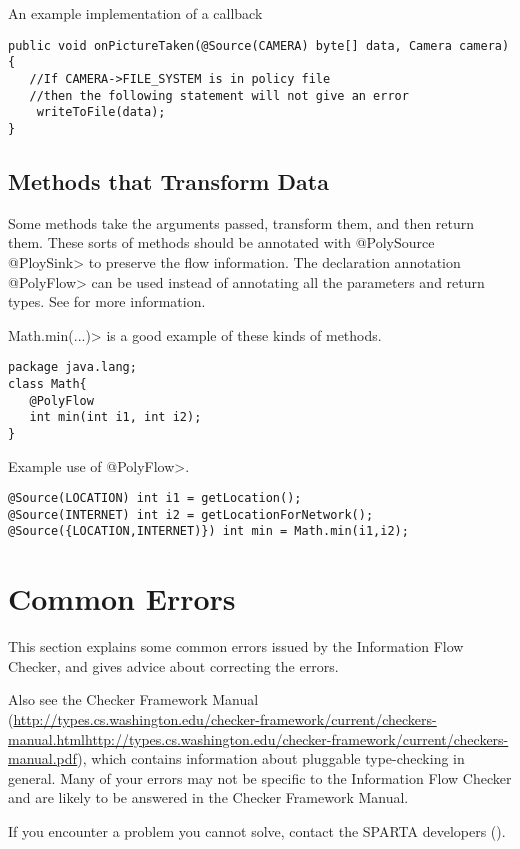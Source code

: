 An example implementation of a callback
\begin{Verbatim}
public void onPictureTaken(@Source(CAMERA) byte[] data, Camera camera){
   //If CAMERA->FILE_SYSTEM is in policy file
   //then the following statement will not give an error
    writeToFile(data);
}
\end{Verbatim}


\subsection{Methods that Transform Data}

Some methods take the arguments passed, transform them, and then return them.  These sorts of 
methods should be annotated with \<@PolySource @PloySink>
  to preserve the flow information.  The declaration annotation \<@PolyFlow> can be used instead of
  annotating all the parameters and return types. See  for more information. 
  
  \<Math.min(...)> is a good example of these kinds of methods. 
  
  \begin{Verbatim}
package java.lang;
class Math{
   @PolyFlow  
   int min(int i1, int i2);
}
\end{Verbatim}

Example use of \<@PolyFlow>.
\begin{Verbatim}
@Source(LOCATION) int i1 = getLocation();
@Source(INTERNET) int i2 = getLocationForNetwork();
@Source({LOCATION,INTERNET)}) int min = Math.min(i1,i2);
 \end{Verbatim}

\section{Common Errors\label{errors}}

This section explains some common errors issued by the Information Flow Checker, and
gives advice about correcting the errors.   

Also see the Checker Framework Manual
(\ifhevea\url{http://types.cs.washington.edu/checker-framework/current/checkers-manual.html}\else\url{http://types.cs.washington.edu/checker-framework/current/checkers-manual.pdf}\fi),
which contains information about pluggable type-checking in general.  Many
of your errors may not be specific to the Information Flow Checker and are likely to be
answered in the Checker Framework Manual.

If you encounter a problem you cannot solve, contact the SPARTA developers ().



